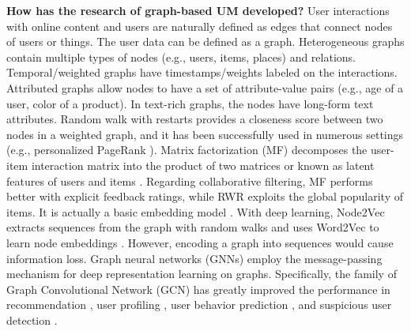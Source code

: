 \documentclass[11pt]{article}
\begin{document}
\vspace{0.05in}
\noindent \textbf{How has the research of graph-based UM developed?} User interactions with online content and users are naturally defined as edges that connect nodes of users or things. The user data can be defined as a graph. Heterogeneous graphs contain multiple types of nodes (e.g., users, items, places) and relations. Temporal/weighted graphs have timestamps/weights labeled on the interactions. Attributed graphs allow nodes to have a set of attribute-value pairs (e.g., age of a user, color of a product). In text-rich graphs, the nodes have long-form text attributes. Random walk with restarts provides a closeness score between two nodes in a weighted graph, and it has been successfully used in numerous settings (e.g., personalized PageRank \cite{page1998pagerank}).
Matrix factorization (MF) decomposes the user-item interaction matrix into the product of two matrices or known as latent features of users and items \cite{koren2009matrix,jiang2012social,jiang2014scalable}. Regarding collaborative filtering, MF performs better with explicit feedback ratings, while RWR exploits the global popularity of items. It is actually a basic embedding model \cite{zhang2018network}.
With deep learning, Node2Vec extracts sequences from the graph with random walks and uses Word2Vec to learn node embeddings \cite{grover2016node2vec}. However, encoding a graph into sequences would cause information loss. Graph neural networks (GNNs) employ the message-passing mechanism for deep representation learning on graphs. Specifically, the family of Graph Convolutional Network (GCN) \cite{kipf2016semi} has greatly improved the performance in recommendation \cite{fan2019graph, he2020lightgcn}, user profiling \cite{chen2019semi, yan2021relation}, user behavior prediction \cite{yu2020identifying, wang2020calendar}, and suspicious user detection \cite{feng2022twibot, feng2022heterogeneity}. 
\end{document}
